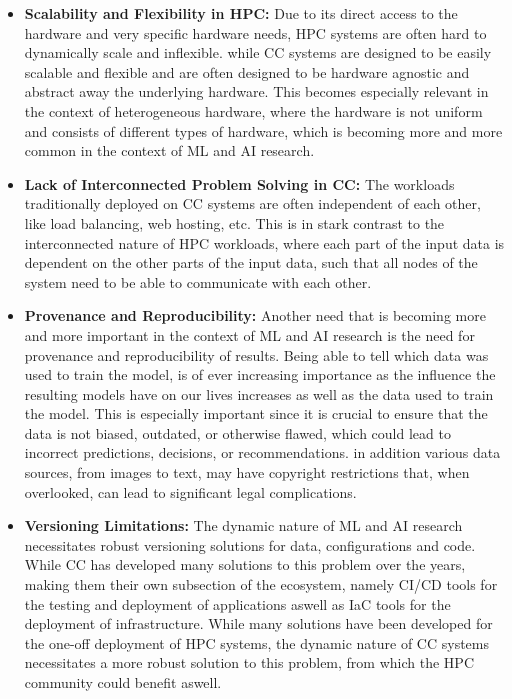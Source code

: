 \begin{itemize}
    \item \textbf{Scalability and Flexibility in \ac{HPC}:}
        Due to its direct access to the hardware and very specific hardware needs, \ac{HPC} systems are often hard to dynamically scale and inflexible. 
        while \ac{CC} systems are designed to be easily scalable and flexible and are often designed to be hardware agnostic and abstract away the underlying hardware.
        This becomes especially relevant in the context of heterogeneous hardware, where the hardware is not uniform and consists of different types of hardware,
        which is becoming more and more common in the context of ML and AI research.
      
    \item \textbf{Lack of Interconnected Problem Solving in \ac{CC}:} 
        The workloads traditionally deployed on \ac{CC} systems are often independent of each other, like load balancing, web hosting, etc. 
        This is in stark contrast to the interconnected nature of \ac{HPC} workloads, where each part of the input data is dependent on the other parts of the input data,
        such that all nodes of the system need to be able to communicate with each other.

    \item \textbf{Provenance and Reproducibility:}
        Another need that is becoming more and more important in the context of ML and AI research is the need for provenance and reproducibility of results.
        Being able to tell which data was used to train the model, is of ever increasing importance as the influence the resulting models have on our lives increases as well as the data used to train the model.
        This is especially important since it is crucial to ensure that the data is not biased, outdated, or otherwise flawed, which could lead to incorrect predictions, decisions, or recommendations. 
        in addition various data sources, from images to text, may have copyright restrictions that, when overlooked, can lead to significant legal complications.

    \item \textbf{Versioning Limitations:} 
        The dynamic nature of ML and AI research necessitates robust versioning solutions for data, configurations and code.
        While \ac{CC} has developed many solutions to this problem over the years, making them their own subsection of the ecosystem,
        namely \ac{CI/CD} tools for the testing and deployment of applications aswell as \ac{IaC} tools for the deployment of infrastructure.
        While many solutions have been developed for the one-off deployment of \ac{HPC} systems, the dynamic nature of \ac{CC} systems necessitates a more robust solution to this problem, 
        from which the \ac{HPC} community could benefit aswell. 
        
\end{itemize}

